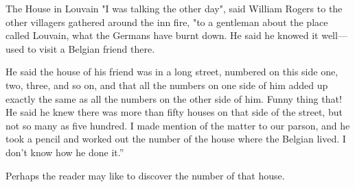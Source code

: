\begin{problem}{The House in Louvain}
    "I was talking the other day", said William Rogers to the other villagers gathered around the inn fire, "to a gentleman about the place called Louvain, what the Germans have burnt down. He said he knowed it well—used to visit a Belgian friend there.

    He said the house of his friend was in a long street, numbered on this side one, two, three, and so on, and that all the numbers on one side of him added up exactly the same as all the numbers on the other side of him. Funny thing that! He said he knew there was more than fifty houses on that side of the street, but not so many as five hundred. I made mention of the matter to our parson, and he took a pencil and worked out the number of the house where the Belgian lived. I don't know how he done it.''

    Perhaps the reader may like to discover the number of that house.
\end{problem}
